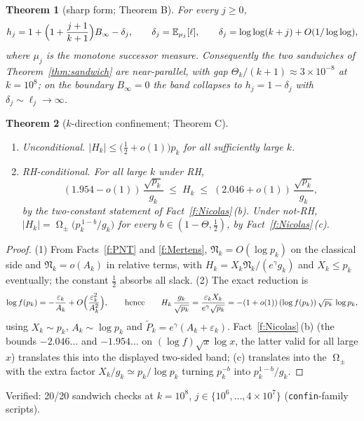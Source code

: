 \documentclass[11pt]{article}
\newtheorem{theorem}{Theorem}[section]
\theoremstyle{remark}
\newcommand{\Xk}{X_k}
\newcommand{\Ak}{A_k}
\newcommand{\eps}{\varepsilon}
\newcommand{\Nn}{\mathfrak{N}}
\newcommand{\Ptil}{\widetilde P}
\newcommand{\gam}{\gamma}
\DeclareMathOperator{\Om}{\Omega}
\begin{document}
\begin{theorem}[sharp form; Theorem B]\label{thm:sharp}
For every $j\ge0$,
\[
h_j=1+\Bigl(1+\frac{j+1}{k+1}\Bigr)B_\infty-\delta_j,
\qquad \delta_j=\mathbb{E}_{\mu_j}[\ell],
\qquad \delta_j=\log\log(k+j)+O(1/\log\log),
\]
where $\mu_j$ is the monotone successor measure. Consequently the two
sandwiches of Theorem~\ref{thm:sandwich} are near-parallel, with gap
$\Theta_k/(k+1)\approx 3\times10^{-8}$ at $k=10^8$; on the boundary
$B_\infty=0$ the band collapses to $h_j=1-\delta_j$ with
$\delta_j\sim\ell_j\to\infty$.
\end{theorem}

\begin{theorem}[$k$-direction confinement; Theorem C]\label{thm:C}
\begin{enumerate}
\item \emph{Unconditional.} $|H_k|\le\bigl(\tfrac12+o(1)\bigr)p_k$ for all
sufficiently large $k$.
\item \emph{RH-conditional.} For all large $k$ under RH,
\[
(1.954-o(1))\,\frac{\sqrt{p_k}}{g_k}\;\le\; H_k\;\le\;(2.046+o(1))\,\frac{\sqrt{p_k}}{g_k},
\]
by the two-constant statement of Fact~\ref{f:Nicolas}\,(b). Under
not-RH, $|H_k|=\Om_\pm\bigl(p_k^{\,1-b}/g_k\bigr)$ for every
$b\in(1-\Theta,\tfrac12)$, by Fact~\ref{f:Nicolas}\,(c).
\end{enumerate}
\end{theorem}

\begin{proof}
(1) From Facts~\ref{f:PNT} and \ref{f:Mertens}, $\Nn_k=O(\log p_k)$ on the
classical side and $\Nn_k=o(\Ak)$ in relative terms, with
$H_k=\Xk\Nn_k/(e^\gam g_k)$ and $\Xk\le p_k$ eventually; the constant
$\tfrac12$ absorbs all slack.
(2) The exact reduction is
\[
\log f(p_k)=-\frac{\eps_k}{\Ak}+O\Bigl(\frac{\eps_k^2}{\Ak^2}\Bigr),
\qquad\text{hence}\qquad
H_k\,\frac{g_k}{\sqrt{p_k}}
=\frac{\eps_k\Xk}{e^\gam\sqrt{p_k}}
=-(1+o(1))\,(\log f(p_k))\,\sqrt{p_k}\,\log p_k ,
\]
using $\Xk\sim p_k$, $\Ak\sim\log p_k$ and $\Ptil_k=e^\gam(\Ak+\eps_k)$.
Fact~\ref{f:Nicolas}\,(b) (the bounds $-2.046\dots$ and $-1.954\dots$ on
$(\log f)\sqrt{x}\log x$, the latter valid for all large $x$) translates this
into the displayed two-sided band; (c) translates into the $\Om_\pm$ with the
extra factor $\Xk/g_k\simeq p_k/\log p_k$ turning $p_k^{-b}$ into
$p_k^{1-b}/g_k$.
\end{proof}

Verified: 20/20 sandwich checks at $k=10^8$, $j\in\{10^6,\dots,4\times10^7\}$
(\texttt{confin}-family scripts).
\end{document}

